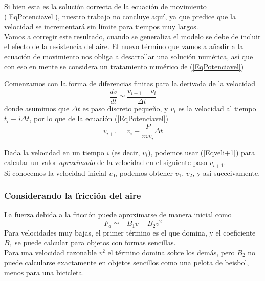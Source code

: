 \begin{frame}
Si bien esta es la solución correcta de la ecuación de movimiento (\ref{EqPotenciavel}), nuestro trabajo no concluye aquí, ya que predice que la velocidad se incrementará sin límite para tiempos muy largos.
\\
\medskip
Vamos a corregir este resultado, cuando se generaliza el modelo se debe de incluir el efecto de la resistencia del aire. El nuevo término que vamos a añadir a la ecuación de movimiento nos obliga a desarrollar una solución numérica, así que con eso en mente se considera un tratamiento numérico de (\ref{EqPotenciavel})
\end{frame}
\begin{frame}
Comenzamos con la forma de diferencias finitas para la derivada de la velocidad
\begin{equation}\label{Eqderivada}
\dfrac{dv}{dt} \simeq \dfrac{v_{i+1}-v_{i}}{\Delta t}
\end{equation}
donde asumimos que $\Delta t$ es paso discreto pequeño, y $v_{i}$ es la velocidad al tiempo $t_{i} \equiv i \Delta t$, por lo que de la ecuación (\ref{EqPotenciavel})
\begin{equation}\label{Eqveli+1}
v_{i+1} = v_{i} + \dfrac{P}{m v_{i}} \Delta t
\end{equation}
\end{frame}
\begin{frame}
Dada la velocidad en un tiempo $i$ (es decir, $v_{i}$), podemos usar (\ref{Eqveli+1}) para calcular un valor \textit{aproximado} de la velocidad en el siguiente paso $v_{i+1}$.
\\
\medskip
Si conocemos la velocidad inicial $v_{0}$, podemos obtener $v_{1}$, $v_{2}$, y así sucecivamente.
\end{frame}
\begin{frame}
\frametitle{Considerando la fricción del aire}
La fuerza debida a la fricción puede aproximarse de manera inicial como
\begin{equation}\label{EqFfriccion}
F_{a} \simeq - B_{1} v - B_{2} v^{2}
\end{equation}
Para velocidades muy bajas, el primer término es el que domina, y el coeficiente $B_{1}$ se puede calcular para objetos con formas sencillas.
\\
\medskip
Para una velocidad razonable $v^{2}$ el término domina sobre los demás, pero $B_{2}$ no puede calcularse exactamente en objetos sencillos como una pelota de beisbol, menos para una bicicleta.
\end{frame}
